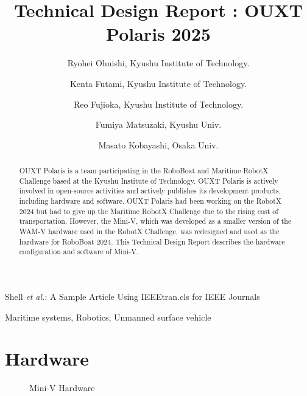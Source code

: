 \documentclass[lettersize,journal]{IEEEtran}
\begin{document}
\title{Technical Design Report : OUXT Polaris 2025}
\author{
    Ryohei Ohnishi, Kyushu Institute of Technology. \\ \and
    Kenta Futami, Kyushu Institute of Technology. \\ \and
    Reo Fujioka, Kyushu Institute of Technology. \\ \and
    Fumiya Matsuzaki, Kyushu Univ. \\ \and
    Masato Kobayashi, Osaka Univ.
}

%
{Shell \MakeLowercase{\textit{et al.}}: A Sample Article Using IEEEtran.cls for IEEE Journals}


\maketitle

\begin{abstract}
  OUXT Polaris is a team participating in the RoboBoat and Maritime RobotX Challenge based at the Kyushu Institute of Technology.
  OUXT Polaris is actively involved in open-source activities and actively publishes its development products, including hardware and software.
  OUXT Polaris had been working on the RobotX 2024 but had to give up the Maritime RobotX Challenge due to the rising cost of transportation. However, the Mini-V, which was developed as a smaller version of the WAM-V hardware used in the RobotX Challenge, was redesigned and used as the hardware for RoboBoat 2024.
  This Technical Design Report describes the hardware configuration and software of Mini-V.
\end{abstract}

\begin{IEEEkeywords}
Maritime systems, Robotics, Unmanned surface vehicle
\end{IEEEkeywords}

\section{Hardware}

\begin{figure}[H]
  \begin{center}
  \end{center}
  \caption{Mini-V Hardware}
  \label{fig:miniv}
\end{figure}
\end{document}
